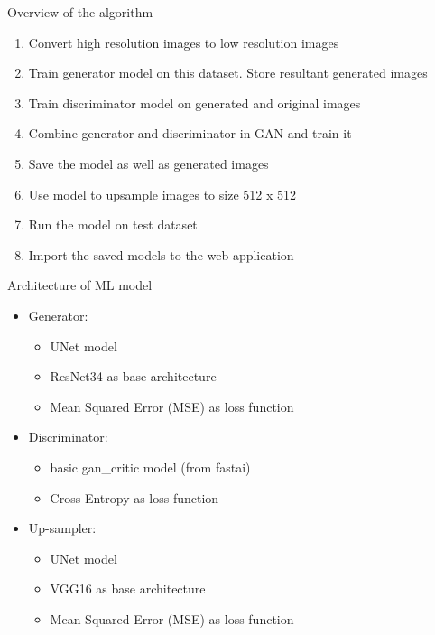 \documentclass{beamer}
\begin{document}
	\begin{frame}{Overview of the algorithm}
		\begin{enumerate}
			\item Convert high resolution images to low resolution images
			\item Train generator model on this dataset. Store resultant generated images
			\item Train discriminator model on generated and original images
			\item Combine generator and discriminator in GAN and train it 
			\item Save the model as well as generated images
			\item Use model to upsample images to size 512 x 512
			\item Run the model on test dataset
			\item Import the saved models to the web application
		\end{enumerate}
	\end{frame}

	\begin{frame}{Architecture of ML model}
		\begin{itemize}
			\item Generator:
			\begin{itemize}
				\item UNet model
				\item ResNet34 as base architecture
				\item Mean Squared Error (MSE) as loss function
			\end{itemize}
			\item Discriminator:
			\begin{itemize}
				\item basic gan\_critic model (from fastai)
				\item Cross Entropy as loss function
			\end{itemize}
			\item Up-sampler:
			\begin{itemize}
				\item UNet model
				\item VGG16 as base architecture
				\item Mean Squared Error (MSE) as loss function
			\end{itemize}
		\end{itemize}
	\end{frame}

\end{document}
